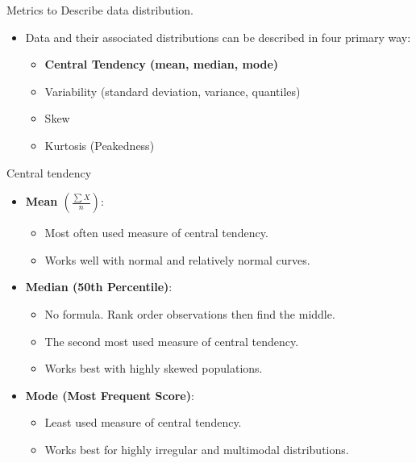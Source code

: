\documentclass[
  ignorenonframetext,
]{beamer}
\providecommand{\tightlist}{%
  \setlength{\itemsep}{0pt}\setlength{\parskip}{0pt}}
\begin{document}
\begin{frame}{Metrics to Describe data distribution.}
\label{metrics-to-describe-data-distribution.-1}
\begin{itemize}
\item
  Data and their associated distributions can be described in four
  primary way:

  \begin{itemize}
  \tightlist
  \item
    \textbf{Central Tendency (mean, median, mode)}
  \item
    Variability (standard deviation, variance, quantiles)
  \item
    Skew
  \item
    Kurtosis (Peakedness)
  \end{itemize}
\end{itemize}
\end{frame}

\begin{frame}{Central tendency}
\label{central-tendency}
\begin{itemize}
\tightlist
\item
  \textbf{Mean \(\left( \frac{\sum X}{n} \right)\)}:

  \begin{itemize}
  \tightlist
  \item
    Most often used measure of central tendency.
  \item
    Works well with normal and relatively normal curves.
  \end{itemize}
\end{itemize}

\begin{itemize}
\tightlist
\item
  \textbf{Median (50th Percentile)}:

  \begin{itemize}
  \tightlist
  \item
    No formula. Rank order observations then find the middle.
  \item
    The second most used measure of central tendency.
  \item
    Works best with highly skewed populations.
  \end{itemize}
\end{itemize}

\begin{itemize}
\tightlist
\item
  \textbf{Mode (Most Frequent Score)}:

  \begin{itemize}
  \tightlist
  \item
    Least used measure of central tendency.
  \item
    Works best for highly irregular and multimodal distributions.
  \end{itemize}
\end{itemize}
\end{frame}
\end{document}
